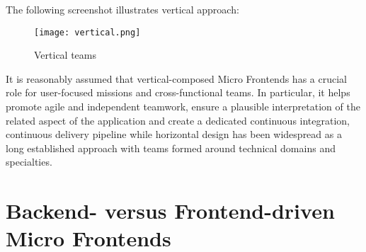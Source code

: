 \documentclass[a4paper]{book}
\begin{document}
The following screenshot illustrates vertical approach:

\begin{figure}[h!]
    \centering
    \captionsetup{justification=centering}
    \texttt{[image: vertical.png]}
    \caption{Vertical teams \cite{Gee20}}
    \label{fig:2}
\end{figure}

It is reasonably assumed that vertical-composed Micro Frontends has a crucial role for user-focused missions and cross-functional teams. In particular, it helps promote agile and independent teamwork, ensure a plausible interpretation of the related aspect of the application and create a dedicated continuous integration, continuous delivery pipeline while horizontal design has been widespread as a long established approach with teams formed around technical domains and specialties.

\section{Backend- versus Frontend-driven Micro Frontends}
\end{document}
